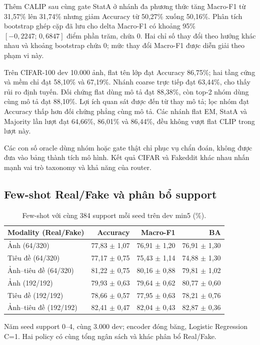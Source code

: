 \documentclass[12pt,a4paper]{article}
\newcommand{\BodySize}{13}
\newcommand{\BodyLeading}{15.6}
\newcommand{\BodyFont}{\fontsize{\BodySize}{\BodyLeading}\selectfont}
\numberwithin{figure}{section}
\numberwithin{table}{section}
\numberwithin{equation}{section}
\begin{document}
Thêm CALIP sau cùng gate StatA ở nhánh đa phương thức tăng Macro-F1 từ 31,57\% lên 31,74\% nhưng
giảm Accuracy từ 50,27\% xuống 50,16\%. Phân tích bootstrap ghép cặp đã lưu cho delta Macro-F1 có
khoảng 95\% $[-0{,}2247;\,0{,}6847]$ điểm phần trăm, chứa 0. Hai chỉ số thay đổi theo hướng khác nhau và khoảng bootstrap chứa 0; mức thay đổi Macro-F1 được diễn giải theo phạm vi này.

Trên CIFAR-100 dev 10.000 ảnh, flat tên lớp đạt Accuracy 86,75\%; hai tầng cứng và mềm chỉ đạt
58,10\% và 67,19\%. Nhánh coarse trực tiếp đạt 63,44\%, cho thấy rủi ro định tuyến. Đối chứng flat
dùng mô tả đạt 88,38\%, còn top-2 nhóm dùng cùng mô tả đạt 88,10\%. Lợi ích quan sát được đến từ
thay mô tả; lọc nhóm đạt Accuracy thấp hơn đối chứng phẳng cùng mô tả. Các nhánh flat EM, StatA và Majority lần lượt đạt
64,66\%, 86,01\% và 86,44\%, đều không vượt flat CLIP trong lượt này.

Các con số oracle dùng nhóm hoặc gate thật chỉ phục vụ chẩn đoán, không được đưa vào bảng thành tích
mô hình. Kết quả CIFAR và Fakeddit khác nhau nhấn mạnh vai trò taxonomy và khả năng của router.

\subsection{Few-shot Real/Fake và phân bổ support}

\begin{table}[H]

\centering
\BodyFont
\caption{Few-shot với cùng 384 support mỗi seed trên dev min5 (\%).}
\begin{tabularx}{\linewidth}{@{}L r r r@{}}
\toprule
Modality (Real/Fake) & Accuracy & Macro-F1 & BA\\
\midrule
Ảnh (64/320) & 77,83 $\pm$ 1,07 & 76,91 $\pm$ 1,20 & 76,91 $\pm$ 1,30\\
Tiêu đề (64/320) & 77,17 $\pm$ 0,75 & 75,43 $\pm$ 1,14 & 74,88 $\pm$ 1,30\\
Ảnh--tiêu đề (64/320) & 81,22 $\pm$ 0,75 & 80,16 $\pm$ 0,88 & 79,81 $\pm$ 1,02\\
Ảnh (192/192) & 79,93 $\pm$ 0,63 & 79,64 $\pm$ 0,62 & 80,77 $\pm$ 0,60\\
Tiêu đề (192/192) & 78,66 $\pm$ 0,57 & 77,95 $\pm$ 0,63 & 78,21 $\pm$ 0,76\\
Ảnh--tiêu đề (192/192) & 82,41 $\pm$ 0,47 & 82,04 $\pm$ 0,43 & 82,87 $\pm$ 0,36\\
\bottomrule
\end{tabularx}
\par\medskip
\begin{minipage}{\linewidth}
    \BodyFont
Năm seed support 0--4, cùng 3.000 dev; encoder đóng băng, Logistic Regression C=1. Hai policy có
cùng tổng ngân sách và khác phân bổ Real/Fake.
\end{minipage}

\end{table}
\end{document}
